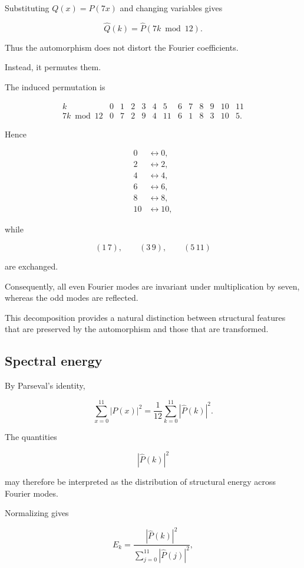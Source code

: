 \documentclass[twoside,onecolumn]{article}
\begin{document}
Substituting $Q(x)=P(7x)$ and changing variables gives

\[
\widehat Q(k)
=
\widehat P(7k\bmod12).
\]

Thus the automorphism does not distort the Fourier coefficients.

Instead, it permutes them.

The induced permutation is

\[
\begin{array}{c|cccccccccccc}
k      &0&1&2&3&4&5&6&7&8&9&10&11\\
\hline
7k\bmod12
       &0&7&2&9&4&11&6&1&8&3&10&5.
\end{array}
\]

Hence

\[
\begin{aligned}
0&\leftrightarrow0,\\
2&\leftrightarrow2,\\
4&\leftrightarrow4,\\
6&\leftrightarrow6,\\
8&\leftrightarrow8,\\
10&\leftrightarrow10,
\end{aligned}
\]

while

\[
(1\,7),\qquad
(3\,9),\qquad
(5\,11)
\]

are exchanged.

Consequently, all even Fourier modes are invariant under multiplication by seven, whereas the odd modes are reflected.

This decomposition provides a natural distinction between structural features that are preserved by the automorphism and those that are transformed.

\subsection{Spectral energy}

By Parseval's identity,

\[
\sum_{x=0}^{11}|P(x)|^2
=
\frac1{12}
\sum_{k=0}^{11}
|\widehat P(k)|^2.
\]

The quantities

\[
|\widehat P(k)|^2
\]

may therefore be interpreted as the distribution of structural energy across Fourier modes.

Normalizing gives

\[
E_k
=
\frac{
|\widehat P(k)|^2
}{
\sum_{j=0}^{11}
|\widehat P(j)|^2
},
\]
\end{document}
